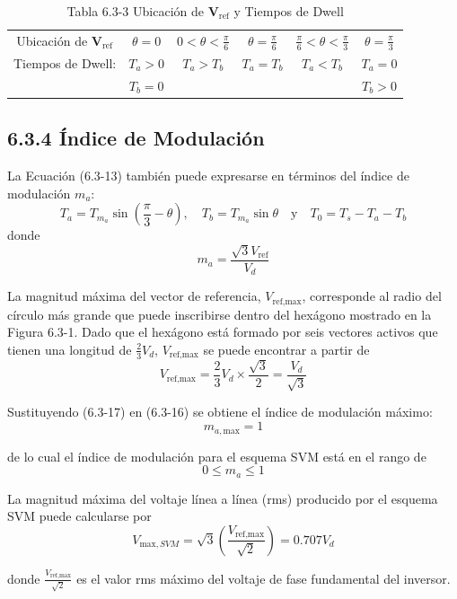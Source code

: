 \documentclass[letterpaper,12pt]{article}
\begin{document}
\begin{table}[h]
\centering
\caption{Tabla 6.3-3 Ubicación de \( \mathbf{V}_{\text{ref}} \) y Tiempos de Dwell}
\begin{tabular}{c c c c c c}
\hline
Ubicación de \( \mathbf{V}_{\text{ref}} \) & $\theta = 0$ & $0 < \theta < \frac{\pi}{6}$ & $\theta = \frac{\pi}{6}$ & $\frac{\pi}{6} < \theta < \frac{\pi}{3}$ & $\theta = \frac{\pi}{3}$ \\ [1em]
Tiempos de Dwell: & $T_a > 0$ & $T_a > T_b$ & $T_a = T_b$ & $T_a < T_b$ & $T_a = 0$ \\
& $T_b = 0$ & & & & $T_b > 0$ \\
\hline
\end{tabular}
\end{table}
\FloatBarrier

\subsection*{6.3.4 Índice de Modulación}
    
La Ecuación (6.3-13) también puede expresarse en términos del índice de modulación \( m_a \):
\[
T_a = T_{m_a} \sin\left(\frac{\pi}{3} - \theta\right), \quad T_b = T_{m_a} \sin \theta \quad \text{y} \quad T_0 = T_s - T_a - T_b \tag{6.3-15}
\]
donde
\[
m_a = \frac{\sqrt{3} V_{\text{ref}}}{V_d} \tag{6.3-16}
\]
    
La magnitud máxima del vector de referencia, \( V_{\text{ref},\text{max}} \), corresponde al radio del círculo más grande que puede inscribirse dentro del hexágono mostrado en la Figura 6.3-1. Dado que el hexágono está formado por seis vectores activos que tienen una longitud de \( \frac{2}{3} V_d \), \( V_{\text{ref},\text{max}} \) se puede encontrar a partir de
\[
V_{\text{ref},\text{max}} = \frac{2}{3} V_d \times \frac{\sqrt{3}}{2} = \frac{V_d}{\sqrt{3}} \tag{6.3-17}
\]
    
Sustituyendo (6.3-17) en (6.3-16) se obtiene el índice de modulación máximo:
\[
m_{a,\text{max}} = 1
\]
    
de lo cual el índice de modulación para el esquema SVM está en el rango de
\[
0 \leq m_a \leq 1 \tag{6.3-18}
\]
    
La magnitud máxima del voltaje línea a línea (rms) producido por el esquema SVM puede calcularse por
\[
V_{\text{max},SVM} = \sqrt{3} \left(\frac{V_{\text{ref},\text{max}}}{\sqrt{2}}\right) = 0.707V_d \tag{6.3-19}
\]
    
donde \( \frac{V_{\text{ref},\text{max}}}{\sqrt{2}} \) es el valor rms máximo del voltaje de fase fundamental del inversor.
    
\end{document}
